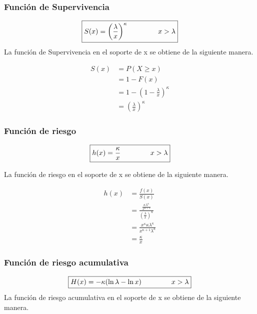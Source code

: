 \documentclass[10pt,a4paper]{article}
\begin{document}
\subsubsection*{Funci\'on de Supervivencia}
\begin{equation*}
\boxed{
S(x) =\left( \frac{\lambda}{x} \right) ^ \kappa \hspace{1.5cm} x > \lambda}
\end{equation*}
\newpage
La función de Supervivencia en el soporte de x se obtiene de la siguiente manera.

\begin{align*}
S(x) &= P(X \geqslant x) \\
     &= 1 - F(x) \\
     &= 1 - \left(1-\frac{\lambda}{x} \right)^\kappa  \\
     &=\left( \frac{\lambda}{x} \right) ^ \kappa
\end{align*}

\subsubsection{Funci\'on de riesgo}
\begin{equation*}
\boxed{
h(x) = \frac{\kappa}{x}  \hspace{1.5cm} x > \lambda}
\end{equation*}

La función de riesgo en el soporte de x se obtiene de la siguiente manera.

\begin{align*}
h(x) &= \frac{f(x)}{S(x)} \\
     &= \frac{\frac{\kappa \lambda ^ \kappa}{ x^{\kappa+1}}}{\left( \frac{\lambda}{x} \right) ^ \kappa} \\
     &= \frac{x^\kappa \kappa \lambda^\kappa}{x^{\kappa+1} \lambda^\kappa}   \\
     &= \frac{\kappa}{x}
\end{align*}

\subsubsection{Funci\'on de riesgo acumulativa}
\begin{equation*}
\boxed{
H(x) = -\kappa (\ln \lambda - \ln x)  \hspace{1.5cm} x > \lambda}
\end{equation*}
La función de riesgo acumulativa en el soporte de x se obtiene de la siguiente manera.
\end{document}

